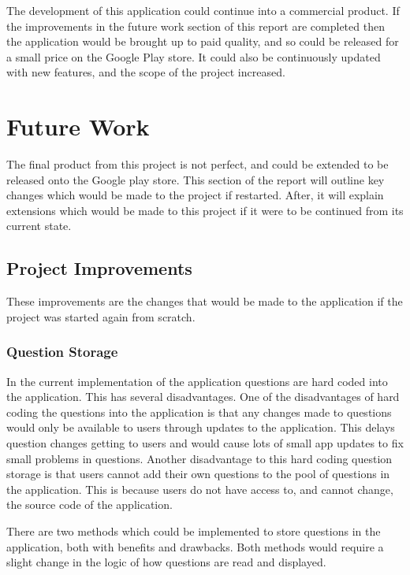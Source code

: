 \documentclass{article}
\begin{document}
The development of this application could continue into a commercial product. If the improvements in the future work section of this report are completed then the application would be brought up to paid quality, and so could be released for a small price on the Google Play store. It could also be continuously updated with new features, and the scope of the project increased. \par

\section{Future Work}
\label{section:futureWork}

The final product from this project is not perfect, and could be extended to be released onto the Google play store. This section of the report will outline key changes which would be made to the project if restarted. After, it will explain extensions which would be made to this project if it were to be continued from its current state. \par

\subsection{Project Improvements}

These improvements are the changes that would be made to the application if the project was started again from scratch.

\subsubsection{Question Storage}

In the current implementation of the application questions are hard coded into the application. This has several disadvantages. One of the disadvantages of hard coding the questions into the application is that any changes made to questions would only be available to users through updates to the application. This delays question changes getting to users and would cause lots of small app updates to fix small problems in questions. Another disadvantage to this hard coding question storage is that users cannot add their own questions to the pool of questions in the application. This is because users do not have access to, and cannot change, the source code of the application. \par

There are two methods which could be implemented to store questions in the application, both with benefits and drawbacks. Both methods would require a slight change in the logic of how questions are read and displayed. \par
\end{document}
